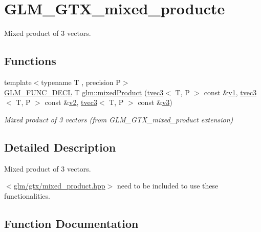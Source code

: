 \hypertarget{group__gtx__mixed__product}{}\section{G\+L\+M\+\_\+\+G\+T\+X\+\_\+mixed\+\_\+producte}
\label{group__gtx__mixed__product}


Mixed product of 3 vectors.  


\subsection*{Functions}
\begin{DoxyCompactItemize}
\item 
{\footnotesize template$<$typename T , precision P$>$ }\\\mbox{\hyperlink{setup_8hpp_ab2d052de21a70539923e9bcbf6e83a51}{G\+L\+M\+\_\+\+F\+U\+N\+C\+\_\+\+D\+E\+CL}} T \mbox{\hyperlink{group__gtx__mixed__product_gaaee4cf80d69cb86de80f12af88b3c3af}{glm\+::mixed\+Product}} (\mbox{\hyperlink{structglm_1_1tvec3}{tvec3}}$<$ T, P $>$ const \&\mbox{\hyperlink{glad_8h_a0779c3b73f9aa3a0ac5b0139b5d291d9}{v1}}, \mbox{\hyperlink{structglm_1_1tvec3}{tvec3}}$<$ T, P $>$ const \&\mbox{\hyperlink{glad_8h_a9a09a1837922b2b806f4589096a52049}{v2}}, \mbox{\hyperlink{structglm_1_1tvec3}{tvec3}}$<$ T, P $>$ const \&\mbox{\hyperlink{glad_8h_acc806b31cbf466ceba6555983d8b814d}{v3}})
\begin{DoxyCompactList}\small\item\em Mixed product of 3 vectors (from G\+L\+M\+\_\+\+G\+T\+X\+\_\+mixed\+\_\+product extension) \end{DoxyCompactList}\end{DoxyCompactItemize}


\subsection{Detailed Description}
Mixed product of 3 vectors. 

$<$\mbox{\hyperlink{mixed__product_8hpp}{glm/gtx/mixed\+\_\+product.\+hpp}}$>$ need to be included to use these functionalities. 

\subsection{Function Documentation}
\mbox{\label{group__gtx__mixed__product_gaaee4cf80d69cb86de80f12af88b3c3af}} 
